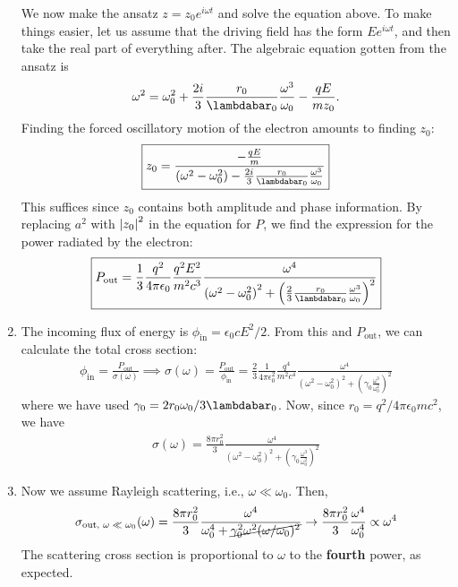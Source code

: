 \documentclass{article}
\theoremstyle{definition}
\newcommand{\f}[2]{\frac{#1}{#2}}
\newcommand{\lp}{\left(}
\newcommand{\rp}{\right)}
\begin{document}
\begin{enumerate}[label=\alph*)]
	We now make the ansatz $z = z_0 e^{i\omega t}$ and solve the equation above. To make things easier, let us assume that the driving field has the form $E e^{i\omega t}$, and then take the real part of everything after. The algebraic equation gotten from the ansatz is 
	\begin{align*}
	\omega^2 = \omega_0^2 + \f{2i}{3} \f{r_0}{\lambdabar_0} \f{\omega^3}{\omega_0} - \f{qE}{mz_0} .
	\end{align*}
	Finding the forced oscillatory motion of the electron amounts to finding $z_0$:
	\begin{align*}
	\boxed{z_0 = \f{ - \f{q E}{m}    }{   (\omega^2 - \omega_0^2) - \f{2i}{3}  \f{r_0}{\lambdabar_0} \f{ \omega^3}{\omega_0}}}
	\end{align*}
	This suffices since $z_0$ contains both amplitude and phase information. By replacing $a^2$ with $\abs{z_0}^2$ in the equation for $P$, we find the expression for the power radiated by the electron:
	\begin{align*}
	\boxed{P_\text{out} = \f{1}{3 } \f{q^2}{4\pi \epsilon_0} \f{q^2 E^2}{m^2 c^3} 
	\f{\omega^4}{\lp \omega^2 - \omega_0^2\rp^2 + \lp \f{2}{3} \f{r_0}{\lambdabar_0} \frac{\omega^3}{\omega_0} \rp^2}  }
	\end{align*}

	
	\item The incoming flux of energy is $\phi_\text{in} = \epsilon_0 c E^2/2$. From this and $P_\text{out}$, we can calculate the total cross section: 
	\begin{align*}
	\phi_\text{in} = \f{P_\text{out}}{\sigma(\omega)} \implies 
	\sigma(\omega) = \f{P_\text{out}}{\phi_\text{in}} = \f{2}{3}\f{1}{4\pi\epsilon_0^2} \f{q^4}{m^2 c^4}  
	\f{\omega^4}{\lp \omega^2 - \omega_0^2\rp^2 +  \lp \gamma_0 \frac{\omega^3}{\omega_0^2} \rp^2} 
	\end{align*}
	where we have used $\gamma_0 = 2r_0 \omega_0/ 3 \lambdabar_0$. Now, since $r_0 = q^2/4\pi \epsilon_0 mc^2 $, we have
	\begin{align*}
	\boxed{ \sigma(\omega) = \f{8\pi r_0^2}{3} \f{\omega^4}{\lp \omega^2 - \omega_0^2\rp^2 + \lp \gamma_0 \frac{\omega^3}{\omega_0^2} \rp^2} }
	\end{align*}
	
	\item Now we assume Rayleigh scattering, i.e., $\omega \ll \omega_0$. Then,
	\begin{align*}
	\sigma_\text{out, $\omega \ll \omega_0$}(\omega) = 	\f{8\pi r_0^2}{3} 
	\f{\omega^4}{\omega_0^4 + \cancel{\gamma_0^2 \omega^2 (\omega/\omega_0)^2}} \to \f{8\pi r_0^2}{3} \f{\omega^4}{\omega_0^4} \propto \omega^4
	\end{align*}
	The scattering cross section is proportional to $\omega$ to the \textbf{fourth} power, as expected. 


\end{enumerate}
\end{document}
